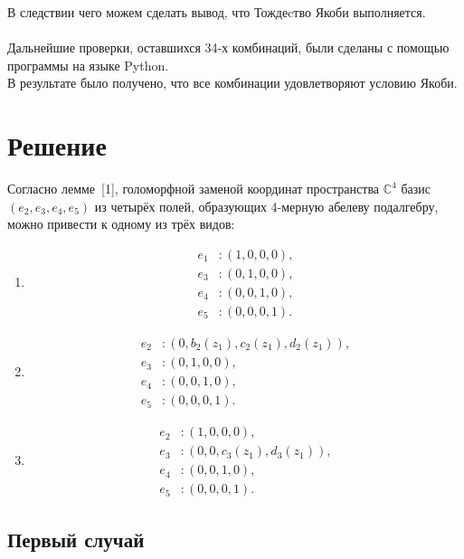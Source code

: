 \href{\href{}{}}{}\documentclass[14pt]{extarticle} %
\begin{document}
В следствии чего можем сделать вывод, что Тождеcтво Якоби выполняется. \\

\\
Дальнейшие проверки, оставшихся 34-х комбинаций, были сделаны с помощью программы на языке Python.
\\

В результате было получено, что все комбинации удовлетворяют условию Якоби.
\newpage
\section{Решение}
Согласно лемме~[1], голоморфной заменой координат пространства $ \mathbb{C}^4 $ базис
\( (e_2, e_3, e_4, e_5) \) из четырёх полей, образующих 4-мерную абелеву подалгебру, можно привести к одному из трёх видов:

\begin{enumerate}
    \item
    \[
    \begin{aligned}
    e_1 &: (1, 0, 0, 0), \\
    e_3 &: (0, 1, 0, 0), \\
    e_4 &: (0, 0, 1, 0), \\
    e_5 &: (0, 0, 0, 1).
    \end{aligned}
    \]

    \item
    \[
    \begin{aligned}
    e_2 &: (0, b_2(z_1), c_2(z_1), d_2(z_1)), \\
    e_3 &: (0, 1, 0, 0), \\
    e_4 &: (0, 0, 1, 0), \\
    e_5 &: (0, 0, 0, 1).
    \end{aligned}
    \]

    \item
    \[
    \begin{aligned}
    e_2 &: (1, 0, 0, 0), \\
    e_3 &: (0, 0, c_3(z_1), d_3(z_1)), \\
    e_4 &: (0, 0, 1, 0), \\
    e_5 &: (0, 0, 0, 1).
    \end{aligned}
    \]
\end{enumerate}

\subsection{Первый случай}
\end{document}
